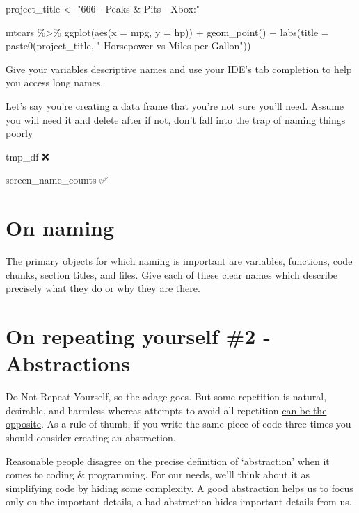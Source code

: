 \documentclass[
  letterpaper,
  DIV=11,
  numbers=noendperiod]{scrreprt}
\newenvironment{Shaded}{\begin{snugshade}}{\end{snugshade}}
\newcommand{\AttributeTok}[1]{\textcolor[rgb]{0.40,0.45,0.13}{#1}}
\newcommand{\FunctionTok}[1]{\textcolor[rgb]{0.28,0.35,0.67}{#1}}
\newcommand{\NormalTok}[1]{\textcolor[rgb]{0.00,0.23,0.31}{#1}}
\newcommand{\OtherTok}[1]{\textcolor[rgb]{0.00,0.23,0.31}{#1}}
\newcommand{\SpecialCharTok}[1]{\textcolor[rgb]{0.37,0.37,0.37}{#1}}
\newcommand{\StringTok}[1]{\textcolor[rgb]{0.13,0.47,0.30}{#1}}
\begin{document}
\begin{Shaded}
\begin{Highlighting}[]
\NormalTok{project\_title }\OtherTok{\textless{}{-}} \StringTok{"666 {-} Peaks \& Pits {-} Xbox:"}

\NormalTok{mtcars }\SpecialCharTok{\%\textgreater{}\%}
  \FunctionTok{ggplot}\NormalTok{(}\FunctionTok{aes}\NormalTok{(}\AttributeTok{x =}\NormalTok{ mpg, }\AttributeTok{y =}\NormalTok{ hp)) }\SpecialCharTok{+}
  \FunctionTok{geom\_point}\NormalTok{() }\SpecialCharTok{+}
  \FunctionTok{labs}\NormalTok{(}\AttributeTok{title =} \FunctionTok{paste0}\NormalTok{(project\_title, }\StringTok{" Horsepower vs Miles per Gallon"}\NormalTok{))}
\end{Highlighting}
\end{Shaded}

Give your variables descriptive names and use your IDE's tab completion
to help you access long names.

Let's say you're creating a data frame that you're not sure you'll need.
Assume you will need it and delete after if not, don't fall into the
trap of naming things poorly

tmp\_df ❌

screen\_name\_counts ✅

\section{On naming}\label{on-naming}

The primary objects for which naming is important are variables,
functions, code chunks, section titles, and files. Give each of these
clear names which describe precisely what they do or why they are there.

\section{On repeating yourself \#2 -
Abstractions}\label{on-repeating-yourself-2---abstractions}

Do Not Repeat Yourself, so the adage goes. But some repetition is
natural, desirable, and harmless whereas attempts to avoid all
repetition
\href{https://testing.googleblog.com/2024/05/dont-dry-your-code-prematurely.html}{can
be the opposite}. As a rule-of-thumb, if you write the same piece of
code three times you should consider creating an abstraction.

Reasonable people disagree on the precise definition of `abstraction'
when it comes to coding \& programming. For our needs, we'll think about
it as simplifying code by hiding some complexity. A good abstraction
helps us to focus only on the important details, a bad abstraction hides
important details from us.
\end{document}
